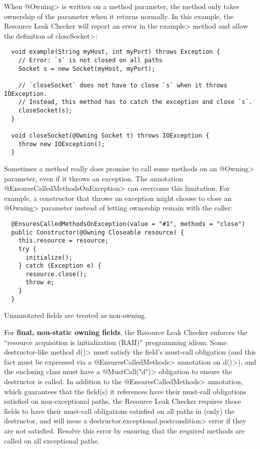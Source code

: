
When \<@Owning> is written on a method parameter, the method only takes ownership of the
parameter when it returns normally.  In this example, the Resource Leak Checker will report
an error in the \<example> method and allow the definition of \<closeSocket>:

\begin{verbatim}
  void example(String myHost, int myPort) throws Exception {
    // Error: `s` is not closed on all paths
    Socket s = new Socket(myHost, myPort);

    // `closeSocket` does not have to close `s` when it throws IOException.
    // Instead, this method has to catch the exception and close `s`.
    closeSocket(s);
  }

  void closeSocket(@Owning Socket t) throws IOException {
    throw new IOException();
  }
\end{verbatim}

Sometimes a method really does promise to call some methods on an \<@Owning> parameter,
even if it throws an exception.  The annotation \<@EnsuresCalledMethodsOnException> can
overcome this limitation.  For example, a constructor that throws an exception might
choose to close an \<@Owning> parameter instead of letting ownership remain with the caller:

\begin{verbatim}
  @EnsuresCalledMethodsOnException(value = "#1", methods = "close")
  public Constructor(@Owning Closeable resource) {
    this.resource = resource;
    try {
      initialize();
    } catch (Exception e) {
      resource.close();
      throw e;
    }
  }
\end{verbatim}


Unannotated fields are treated as non-owning.

For \textbf{final, non-static owning fields},
the Resource Leak Checker enforces the ``resource acquisition is
initialization (RAII)'' programming idiom.  Some
destructor-like method \<d()> must satisfy the field's must-call obligation
(and this fact must be expressed via a \<@EnsuresCalledMethods> annotation on \<d()>),
and the enclosing class must have a \<@MustCall("d")> obligation to
ensure the destructor is called. In addition to the \<@EnsuresCalledMethods> annotation,
which guarantees that the field(s) it references have their must-call obligations satisfied
on non-exceptional paths, the Resource Leak Checker requires those fields to have their must-call
obligations satisfied on all paths in (only) the destructor, and will issue a \<destructor.exceptional.postcondition>
error if they are not satisfied. Resolve this error by ensuring that the required methods are called
on all exceptional paths.

